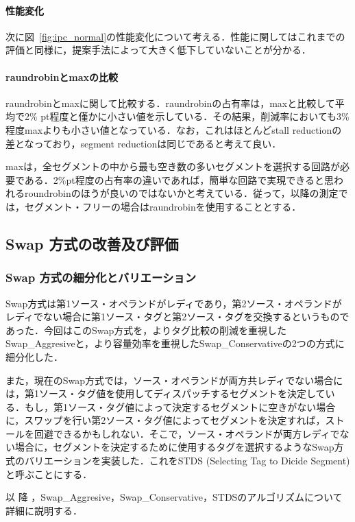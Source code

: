 \documentclass[twocolumn]{jsarticle}
\begin{document}
  \paragraph{性能変化}
  次に図~\ref{fig:ipc_normal}の性能変化について考える．性能に関してはこれまでの評価と同様に，提案手法によって大きく低下していないことが分かる．
  
  \paragraph{raundrobinとmaxの比較}
  raundrobinとmaxに関して比較する．raundrobinの占有率は，maxと比較して平均で2\% pt程度と僅かに小さい値を示している．その結果，削減率においても3\%程度maxよりも小さい値となっている．なお，これはほとんどstall reductionの差となっており，segment reductionは同じであると考えて良い．
  
  maxは，全セグメントの中から最も空き数の多いセグメントを選択する回路が必要である．2\%pt程度の占有率の違いであれば，簡単な回路で実現できると思われるroundrobinのほうが良いのではないかと考えている．従って，以降の測定では，セグメント・フリーの場合はraundrobinを使用することとする．

  \clearpage
  \subsection{Swap 方式の改善及び評価}
  \subsubsection{Swap 方式の細分化とバリエーション}
  Swap方式は第1ソース・オペランドがレディであり，第2ソース・オペランドがレディでない場合に第1ソース・タグと第2ソース・タグを交換するというものであった．今回はこのSwap方式を，よりタグ比較の削減を重視したSwap\_Aggresiveと，より容量効率を重視したSwap\_Conservativeの2つの方式に細分化した．
  
  また，現在のSwap方式では，ソース・オペランドが両方共レディでない場合には，第1ソース・タグ値を使用してディスパッチするセグメントを決定している．もし，第1ソース・タグ値によって決定するセグメントに空きがない場合に，スワップを行い第2ソース・タグ値によってセグメントを決定すれば，ストールを回避できるかもしれない．そこで，ソース・オペランドが両方レディでない場合に，セグメントを決定するために使用するタグを選択するようなSwap方式のバリエーションを実装した．これをSTDS (Selecting Tag to Dicide Segment)と呼ぶことにする．

  以 降 ，Swap\_Aggresive，Swap\_Conservative，STDSのアルゴリズムについて詳細に説明する．
\end{document}
